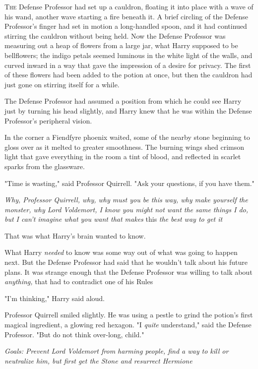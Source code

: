 
\lettrine{T}{he} Defense
Professor had set up a cauldron, floating it into place with a wave of his
wand, another wave starting a fire beneath it. A brief circling of the Defense
Professor's finger had set in motion a long-handled spoon, and it had continued
stirring the cauldron without being held. Now the Defense Professor was
measuring out a heap of flowers from a large jar, what Harry supposed to be
bellflowers; the indigo petals seemed luminous in the white light of the walls,
and curved inward in a way that gave the impression of a desire for privacy.
The first of these flowers had been added to the potion at once, but then the
cauldron had just gone on stirring itself for a while.

The Defense Professor had assumed a position from which he could see Harry just
by turning his head slightly, and Harry knew that he was within the Defense
Professor's peripheral vision.

In the corner a Fiendfyre phoenix waited, some of the nearby stone beginning to
gloss over as it melted to greater smoothness. The burning wings shed crimson
light that gave everything in the room a tint of blood, and reflected in
scarlet sparks from the glassware.

"Time is wasting," said Professor Quirrell. "Ask your questions, if you have
them."

\emph{Why, Professor Quirrell, why, why must you be this way, why make yourself
the monster, why Lord Voldemort, I know you might not want the same things I
do, but I can't imagine what you want that makes} this \emph{the best way to
get it{\el}}

That was what Harry's brain wanted to know.

What Harry \emph{needed} to know was{\el} some way out of what was going to
happen next. But the Defense Professor had said that he wouldn't talk about his
future plans. It was strange enough that the Defense Professor was willing to
talk about \emph{anything,} that had to contradict one of his Rules{\el}

"I'm thinking," Harry said aloud.

Professor Quirrell smiled slightly. He was using a pestle to grind the potion's
first magical ingredient, a glowing red hexagon. "I \emph{quite} understand,"
said the Defense Professor. "But do not think over-long, child."

\emph{Goals: Prevent Lord Voldemort from harming people, find a way to kill or
neutralize him, but first get the Stone and resurrect Hermione{\el}}

